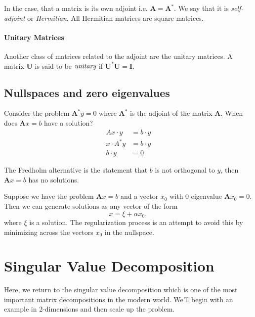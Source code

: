 \documentclass[12pt]{article}
\renewcommand{\vec}[1]{\mathbf{#1}}
\theoremstyle{definition}
\theoremstyle{remark}
\numberwithin{equation}{section}
\begin{document}
In the case, that a matrix is its own adjoint i.e. $\vec{A} = \vec{A}^*$. We say that it is \emph{self-adjoint} or \emph{Hermitian}. All Hermitian matrices are square matrices.


\paragraph{Unitary Matrices}%
\label{par:unitary_matrices}
Another class of matrices related to the adjoint are the unitary matrices. A matrix $\vec{U}$ is said to be $\emph{unitary}$ if $\vec{U}^* \vec{U} = \vec{I}$. 


\subsection{Nullspaces and zero eigenvalues}%
\label{sub:nullspaces}

Consider the problem $\vec{A}^*y = 0$ where $\vec{A}^*$ is the adjoint of the matrix $\vec{A}$. When does $\vec{A}x=b$ have a solution?
\begin{align}
  Ax \cdot y &= b \cdot y\\
  x\cdot A^*y &= b\cdot y \\
  b\cdot y &= 0
\end{align}

The Fredholm alternative is the statement that $b$ is not orthogonal to $y$, then $\vec{A}x=b$ has no solutions.

Suppose we have the problem $\vec{A}x=b$ and a vector $x_0$ with 0 eigenvalue $\vec{A}x_0 = 0$. Then we can generate solutions as any vector of the form
\begin{equation}
  x = \xi + \alpha x_0,
\end{equation}
where $\xi$ is a solution. The regularization process is an attempt to avoid this by minimizing across the vectors $x_0$ in the nullspace.

\section{Singular Value Decomposition}%
\label{sec:singular_value_decomposition}


Here, we return to the singular value decomposition which is one of the most important matrix decompositions in the modern world. We'll begin with an example in 2-dimensions and then scale up the problem.
\end{document}
